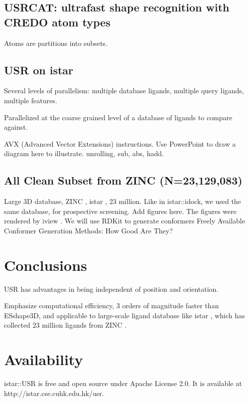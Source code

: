 \subsection{USRCAT: ultrafast shape recognition with CREDO atom types}

Atoms are partitions into subsets.

\subsection{USR on istar}

Several levels of parallelism: multiple database ligands, multiple query ligands, multiple features.

Parallelized at the coarse grained level of a database of ligands to compare against.

AVX (Advanced Vector Extensions) instructions. Use PowerPoint to draw a diagram here to illustrate. unrolling, sub, abs, hadd.

\subsection{All Clean Subset from ZINC (N=23,129,083)}

Large 3D database, ZINC \citep{532,1178}, istar \citep{1362}, 23 million.
Like in istar::idock, we used the same database, for prospective screening.
Add figures here. The figures were rendered by iview \citep{1366}.
We will use RDKit to generate conformers \citep{1127} Freely Available Conformer Generation Methods: How Good Are They?

\section{Conclusions}

USR has advantages in being independent of position and orientation.

Emphasize computational efficiency, 3 orders of magnitude faster than ESshape3D, and applicable to large-scale ligand database like istar \citep{1362}, which has collected 23 million ligands from ZINC \citep{532,1178}.

\section{Availability}

istar::USR is free and open source under Apache License 2.0. It is available at http://istar.cse.cuhk.edu.hk/usr.

